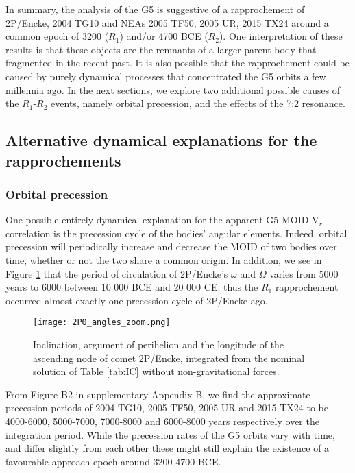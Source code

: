 \documentclass[letters,a4paper,fleqn,usenatbib]{mnras}
\begin{document}
 In summary, the analysis of the G5 is suggestive of a rapprochement of 2P/Encke, 2004 TG10 and NEAs 2005 TF50, 2005 UR, 2015 TX24 around a common epoch of 3200 ($R_1$) and/or 4700 BCE ($R_2$). One interpretation of these results is that these objects are the remnants of a larger parent body that fragmented in the recent past. It is also possible that the rapprochement could be caused by purely dynamical processes that concentrated the G5 orbits a few millennia ago. In the next sections, we explore two additional possible causes of the $R_1$-$R_2$ events, namely orbital precession, and the effects of the 7:2 resonance.
 
 \subsection{Alternative dynamical explanations for the rapprochements} 
 
 \subsubsection{Orbital precession}\label{sec:G5_precession}
 
 One possible entirely dynamical explanation for the apparent G5 MOID-V$_r$ correlation is the precession cycle of the bodies' angular elements. Indeed, orbital precession will periodically increase and  decrease the MOID of two bodies over time, whether or not the two share a common origin. In addition, we see in Figure \ref{fig:2P_angles} that the period of circulation of 2P/Encke's $\omega$ and $\Omega$ varies from 5000 years to 6000 between 10 000 BCE and 20 000 CE: thus the $R_1$ rapprochement occurred almost exactly one precession cycle of 2P/Encke ago. 
 
 \begin{figure}
     \centering
     \texttt{[image: 2P0\_angles\_zoom.png]}
     \caption{Inclination, argument of perihelion and the longitude of the ascending node of comet 2P/Encke, integrated from the nominal solution of Table \ref{tab:IC} without non-gravitational forces.} 
     \label{fig:2P_angles}
 \end{figure}
 
  From Figure B2 in supplementary Appendix B, we find the approximate precession periods of 2004 TG10, 2005 TF50, 2005 UR and 2015 TX24 to be 4000-6000, 5000-7000, 7000-8000 and 6000-8000 years respectively over the integration period. While the precession rates of the G5 orbits vary with time, and differ slightly from each other these might still explain the existence of a favourable approach epoch around 3200-4700 BCE. 
 
\end{document}
